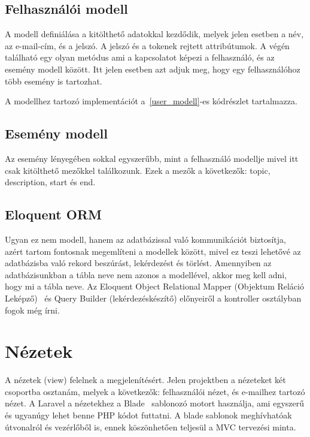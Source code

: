 \documentclass[
]{thesis-ekf}
\theoremstyle{definition}
\theoremstyle{remark}
\begin{document}
	\subsection{Felhasználói modell}
	A modell definiálása a kitölthető adatokkal kezdődik, melyek jelen esetben a név, az e-mail-cím, és a jelszó. A jelszó és a tokenek rejtett attribútumok. A végén található egy olyan metódus ami a kapcsolatot képezi a felhasználó, és az esemény modell között. Itt jelen esetben azt adjuk meg, hogy egy felhasználóhoz több esemény is tartozhat.
	
	A modellhez tartozó implementációt a~\ref{user_modell}-es kódrészlet tartalmazza.
	
	
	
	\subsection{Esemény modell}
	Az esemény lényegében sokkal egyszerűbb, mint a felhasználó modellje mivel itt csak kitölthető mezőkkel találkozunk. Ezek a mezők a következők: topic, description, start és end.
	
	\subsection{Eloquent ORM}
	Ugyan ez nem modell, hanem az adatbázissal való kommunikációt biztosítja, azért tartom fontosnak megemlíteni a modellek között, mivel ez teszi lehetővé az adatbázisba való rekord beszúrást, lekérdezést és törlést. Amennyiben az adatbázisunkban a tábla neve nem azonos a modellével, akkor meg kell adni, hogy mi a tábla neve. Az Eloquent Object Relational Mapper (Objektum Reláció Leképző)~\cite{laravel_eloquent} és Query Builder (lekérdezéskészítő) előnyeiről a kontroller osztályban fogok még írni.
	
	\section{Nézetek}
	A nézetek (view) felelnek a megjelenítésért. Jelen projektben a nézeteket két csoportba osztanám, melyek a következők: felhasználói nézet, és e-mailhez tartozó nézet. A Laravel a nézetekhez a Blade~\cite{laravel_blade} sablonozó motort használja, ami egyszerű és ugyanúgy lehet benne PHP kódot futtatni. A blade sablonok meghívhatóak útvonalról és vezérlőből is, ennek köszönhetően teljesül a MVC tervezési minta. 
	
\end{document}
